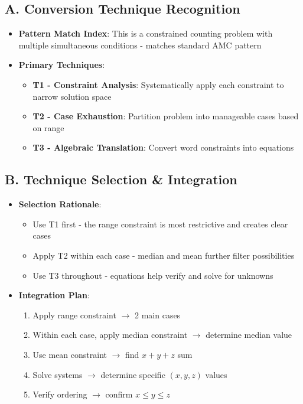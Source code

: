 \documentclass[11pt]{article}
\begin{document}
\begin{techniquesbox}
\subsection*{A. Conversion Technique Recognition}
\begin{itemize}[leftmargin=*]
    \item \textbf{Pattern Match Index}: This is a constrained counting problem with multiple simultaneous conditions - matches standard AMC pattern
    
    \item \textbf{Primary Techniques}:
    \begin{itemize}
        \item \textbf{T1 - Constraint Analysis}: Systematically apply each constraint to narrow solution space
        \item \textbf{T2 - Case Exhaustion}: Partition problem into manageable cases based on range
        \item \textbf{T3 - Algebraic Translation}: Convert word constraints into equations
    \end{itemize}
\end{itemize}

\subsection*{B. Technique Selection \& Integration}
\begin{itemize}[leftmargin=*]
    \item \textbf{Selection Rationale}: 
    \begin{itemize}
        \item Use T1 first - the range constraint is most restrictive and creates clear cases
        \item Apply T2 within each case - median and mean further filter possibilities
        \item Use T3 throughout - equations help verify and solve for unknowns
    \end{itemize}
    
    \item \textbf{Integration Plan}:
    \begin{enumerate}
        \item Apply range constraint $\rightarrow$ 2 main cases
        \item Within each case, apply median constraint $\rightarrow$ determine median value
        \item Use mean constraint $\rightarrow$ find $x + y + z$ sum
        \item Solve systems $\rightarrow$ determine specific $(x, y, z)$ values
        \item Verify ordering $\rightarrow$ confirm $x \leq y \leq z$
    \end{enumerate}
\end{itemize}


\end{techniquesbox}
\end{document}
